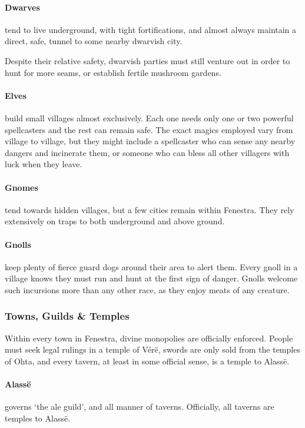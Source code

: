 \begin{multicols}{2}
\paragraph{Dwarves} tend to live underground, with tight fortifications, and almost always maintain a direct, safe, tunnel to some nearby dwarvish city.

Despite their relative safety, dwarvish parties must still venture out in order to hunt for more seams, or establish fertile mushroom gardens.

\paragraph{Elves} build small villages almost exclusively.
Each one needs only one or two powerful spellcasters and the rest can remain safe.
The exact magics employed vary from village to village, but they might include a spellcaster who can sense any nearby dangers and incinerate them, or someone who can bless all other villagers with luck when they leave.

\paragraph{Gnomes} tend towards hidden villages, but a few cities remain within Fenestra.
They rely extensively on traps to both underground and above ground.

\paragraph{Gnolls} keep plenty of fierce guard dogs around their area to alert them.
Every gnoll in a village knows they must run and hunt at the first sign of danger.
Gnolls welcome such incursions more than any other race, as they enjoy meats of any creature.

\subsubsection{Towns, Guilds \& Temples}

Within every town in Fenestra, divine monopolies are officially enforced.
People must seek legal rulings in a temple of V\'{e}r\"{e}, swords are only sold from the temples of Ohta, and every tavern, at least in some official sense, is a temple to Alass\"{e}.

\paragraph{Alass\"{e}} governs `the ale guild', and all manner of taverns.  Officially, all taverns are temples to Alass\"{e}.


\end{multicols}
